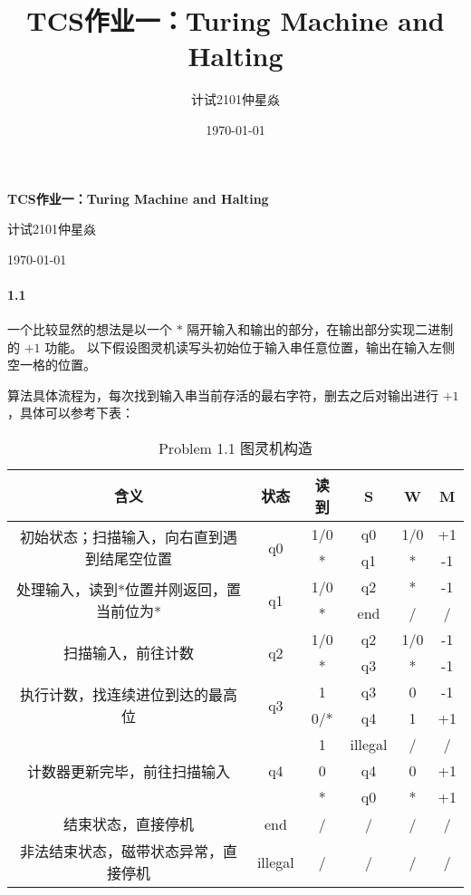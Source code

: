 \documentclass[12pt, a4paper, oneside]{ctexart}
\title{\textbf{TCS作业一：Turing Machine and Halting}}
\author{计试2101仲星焱}
\date{\today}
\begin{document}
	\textbf{TCS作业一：Turing Machine and Halting}
	
	计试2101仲星焱
	
	\today
	\paragraph{1.1}
	一个比较显然的想法是以一个 $*$ 隔开输入和输出的部分，在输出部分实现二进制的 $+1$ 功能。
	以下假设图灵机读写头初始位于输入串任意位置，输出在输入左侧空一格的位置。
	
	算法具体流程为，每次找到输入串当前存活的最右字符，删去之后对输出进行 $+1$，具体可以参考下表：
	\begin{table}[htbp]
		\centering
		\caption{Problem 1.1 图灵机构造}
		\begin{tabular}{|c|c|c|c|c|c|}
			\toprule
			含义    & 状态    & 读到    & S     & W     & M \\
			\midrule
			\multirow{2}[4]{*}{初始状态；扫描输入，向右直到遇到结尾空位置} & \multirow{2}[4]{*}{q0} & 1/0   & q0    & 1/0   & +1 \\
			\cmidrule{3-6}          &       & *     & q1    & *     & -1 \\
			\midrule
			\multirow{2}[4]{*}{处理输入，读到*位置并刚返回，置当前位为*} & \multirow{2}[4]{*}{q1} & 1/0   & q2    & *     & -1 \\
			\cmidrule{3-6}          &       & *     & end   & /     & / \\
			\midrule
			\multirow{2}[4]{*}{扫描输入，前往计数} & \multirow{2}[4]{*}{q2} & 1/0   & q2    & 1/0   & -1 \\
			\cmidrule{3-6}          &       & *     & q3    & *     & -1 \\
			\midrule
			\multirow{2}[4]{*}{执行计数，找连续进位到达的最高位} & \multirow{2}[4]{*}{q3} & 1     & q3    & 0     & -1 \\
			\cmidrule{3-6}          &       & 0/*   & q4    & 1     & +1 \\
			\midrule
			\multirow{3}[6]{*}{计数器更新完毕，前往扫描输入} & \multirow{3}[6]{*}{q4} & 1     & illegal & /     & / \\
			\cmidrule{3-6}          &       & 0     & q4    & 0     & +1 \\
			\cmidrule{3-6}          &       & *     & q0    & *     & +1 \\
			\midrule
			结束状态，直接停机 & end   & /     & /     & /     & / \\
			\midrule
			非法结束状态，磁带状态异常，直接停机 & illegal & /     & /     & /     & / \\
			\bottomrule
		\end{tabular}%
		\label{tab:addlabel}%
	\end{table}%
	
\end{document}
